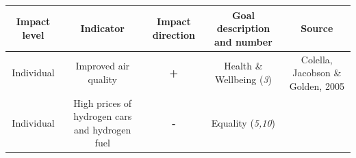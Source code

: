 \documentclass[
]{book}
\begin{document}
\begin{longtable}[]{@{}ccccc@{}}
\toprule
\begin{minipage}[b]{0.17\columnwidth}\centering
Impact level\strut
\end{minipage} & \begin{minipage}[b]{0.16\columnwidth}\centering
Indicator\strut
\end{minipage} & \begin{minipage}[b]{0.17\columnwidth}\centering
Impact direction\strut
\end{minipage} & \begin{minipage}[b]{0.17\columnwidth}\centering
Goal description and number\strut
\end{minipage} & \begin{minipage}[b]{0.17\columnwidth}\centering
Source\strut
\end{minipage}\tabularnewline
\midrule
\endhead
\begin{minipage}[t]{0.17\columnwidth}\centering
Individual\strut
\end{minipage} & \begin{minipage}[t]{0.16\columnwidth}\centering
Improved air quality\strut
\end{minipage} & \begin{minipage}[t]{0.17\columnwidth}\centering
\textbf{+}\strut
\end{minipage} & \begin{minipage}[t]{0.17\columnwidth}\centering
Health \& Wellbeing (\emph{3})\strut
\end{minipage} & \begin{minipage}[t]{0.17\columnwidth}\centering
Colella, Jacobson \& Golden, 2005\strut
\end{minipage}\tabularnewline
\begin{minipage}[t]{0.17\columnwidth}\centering
Individual\strut
\end{minipage} & \begin{minipage}[t]{0.16\columnwidth}\centering
High prices of hydrogen cars and hydrogen fuel\strut
\end{minipage} & \begin{minipage}[t]{0.17\columnwidth}\centering
\textbf{-}\strut
\end{minipage} & \begin{minipage}[t]{0.17\columnwidth}\centering
Equality (\emph{5,10})\strut
\end{minipage} & \begin{minipage}[t]{0.17\columnwidth}\centering

\end{minipage}
\end{longtable}
\end{document}

